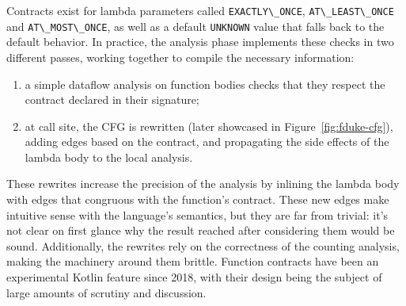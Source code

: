 \documentclass[runningheads]{llncs}
\newcommand{\kt}[1]{\lstinline[language=Kotlin]|#1|}
\begin{document}

Contracts exist for lambda parameters called \kt{EXACTLY\_ONCE}, \kt{AT\_LEAST\_ONCE} and \kt{AT\_MOST\_ONCE}, as well as a default \kt{UNKNOWN} value that falls back to the default behavior. In practice, the analysis phase implements these checks in two different passes, working together to compile the necessary information:
\begin{enumerate}
  \item a simple dataflow analysis on function bodies checks that they respect the contract declared in their signature;
  \item at call site, the CFG is rewritten (later showcased in Figure~\ref{fig:fduke-cfg}), adding edges based on the contract, and propagating the side effects of the lambda body to the local analysis.
\end{enumerate}
These rewrites increase the precision of the analysis by inlining the lambda body with edges that congruous with the function's contract. These new edges make intuitive sense with the language's semantics, but they are far from trivial: it's not clear on first glance why the result reached after considering them would be sound. Additionally, the rewrites rely on the correctness of the counting analysis, making the machinery around them brittle. Function contracts have been an experimental Kotlin feature since 2018, with their design being the subject of large amounts of scrutiny and discussion.
\end{document}
